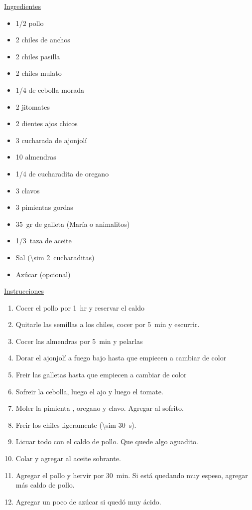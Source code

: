 \underline{Ingredientes}
\begin{itemize}
\item \num{1/2} pollo
\item 2 chiles de anchos
\item 2 chiles pasilla
\item 2 chiles mulato
\item \num{1/4} de cebolla morada
\item 2 jitomates
\item 2 dientes ajos chicos
\item 3 cucharada de ajonjolí
\item 10 almendras
\item \num{1/4} de cucharadita de oregano
\item 3 clavos
\item 3 pimientas gordas
\item \SI{35}{gr} de galleta (María o animalitos)
\item \SI{1/3}{taza} de aceite
\item Sal (\SI{\sim 2}{cucharaditas})
\item Azúcar (opcional)
\end{itemize}

\underline{Instrucciones}
\begin{enumerate}
\item Cocer el pollo por \SI{1}{hr} y reservar el caldo
\item Quitarle las semillas a los chiles, cocer por \SI{5}{min} y escurrir.
\item Cocer las almendras por \SI{5}{min} y pelarlas
\item Dorar el ajonjolí a fuego bajo hasta que empiecen a cambiar de color
\item Freir las galletas hasta que empiecen a cambiar de color
\item Sofreir la cebolla, luego el ajo y luego el tomate.
\item Moler la pimienta , oregano y clavo. Agregar al sofrito.
\item Freir los chiles ligeramente (\SI{\sim 30}{s}).
\item Licuar todo con el caldo de pollo. Que quede algo aguadito.
\item Colar y agregar al aceite sobrante.
\item Agregar el pollo y hervir por \SI{30}{min}. Si está quedando muy espeso, agregar más caldo de pollo.
\item Agregar un poco de azúcar si quedó muy ácido.
\end{enumerate}